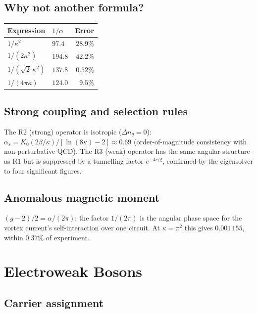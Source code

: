 \documentclass[11pt,a4paper]{article}
\begin{document}
\subsection{Why not another formula?}

\begin{center}
\begin{tabular}{llr}
\toprule
Expression & $1/\alpha$ & Error \\
\midrule
$1/\kappa^2$             & $97.4$  & $28.9\%$ \\
$1/(2\kappa^2)$          & $194.8$ & $42.2\%$ \\
$1/(\sqrt{2}\,\kappa^2)$ & $137.8$ & $0.52\%$ \\
$1/(4\pi\kappa)$         & $124.0$ & $9.5\%$ \\
\bottomrule
\end{tabular}
\end{center}

\subsection{Strong coupling and selection rules}

The R2 (strong) operator is isotropic ($\Delta n_\theta = 0$):
$\alpha_s = K_0(2\beta/\kappa)/[\ln(8\kappa)-2] \approx 0.69$
(order-of-magnitude consistency with non-perturbative QCD).  The
R3 (weak) operator has the same angular structure as R1 but is
suppressed by a tunnelling factor $e^{-4r/\xi}$, confirmed by
the eigensolver to four significant figures.

\subsection{Anomalous magnetic moment}

$(g-2)/2 = \alpha/(2\pi)$: the factor $1/(2\pi)$ is the angular
phase space for the vortex current's self-interaction over one
circuit.  At $\kappa = \pi^2$ this gives $0.001\,155$, within
$0.37\%$ of experiment.


\section{Electroweak Bosons}
\label{sec:ewk}

\subsection{Carrier assignment}
\end{document}
